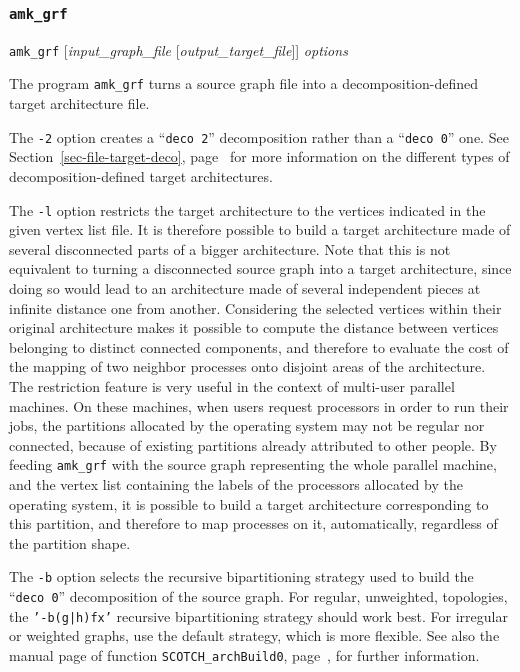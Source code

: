 \subsubsection{\texttt{amk\_grf}}
\label{sec-prog-amkgrf}

\begin{itemize}
\progsyn
\texttt{amk\_grf} [{\it input\_graph\_file} [{\it output\_target\_file}]] {\it options}

\progdes
The program \texttt{amk\_grf} turns a source graph file into a
decomposition-defined target architecture file.

The \texttt{-2} option creates a ``\texttt{deco~2}'' decomposition
rather than a ``\texttt{deco~0}'' one. See
Section~\ref{sec-file-target-deco},
page~\pageref{sec-file-target-deco} for more information on the
different types of decomposition-defined target architectures.

The \texttt{-l} option restricts the target architecture to the vertices indicated
in the given vertex list file. It is therefore possible
to build a target architecture made of several disconnected parts of a bigger
architecture.
Note that this is not equivalent to turning a disconnected source graph into
a target architecture, since doing so would lead to an architecture made of
several independent pieces at infinite distance one from another.
Considering the selected vertices within their original architecture makes
it possible to compute the distance between vertices belonging to distinct
connected components, and therefore to evaluate the cost of the mapping of
two neighbor processes onto disjoint areas of the architecture.
\\
The restriction feature is very useful in the context of multi-user parallel
machines. On these machines, when users request processors in order to run
their jobs, the partitions allocated by the operating system may not be
regular nor connected, because of existing partitions already attributed
to other people.
By feeding \texttt{amk\_grf} with the source graph representing the
whole parallel machine, and the vertex list containing the labels of the
processors allocated by the operating system, it is possible to build a
target architecture corresponding to this partition, and therefore to map
processes on it, automatically, regardless of the partition shape.

The \texttt{-b} option selects the recursive bipartitioning strategy used
to build the ``\texttt{deco~0}'' decomposition of the source
graph. For regular, unweighted, topologies, the \texttt{'-b(g|h)fx'}
recursive bipartitioning strategy should work best. For irregular or
weighted graphs, use the default strategy, which is more flexible. See
also the manual page of function \texttt{SCOTCH\_\lbt arch\lbo Build0},
page~\pageref{sec-lib-arch-build}, for further information.


\end{itemize}
